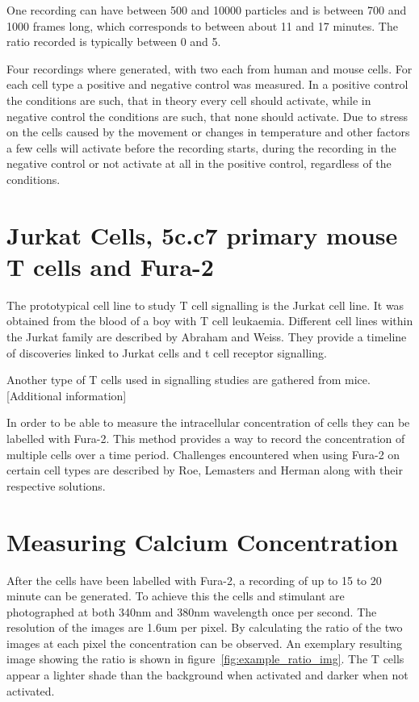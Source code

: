 
One recording can have between 500 and 10000 particles and is between 700 and 1000 frames long, which corresponds to between about 11 and 17 minutes. The ratio recorded is typically between 0 and 5.

Four recordings where generated, with two each from human and mouse cells. For each cell type a positive and negative control was measured. In a positive control the conditions are such, that in theory every cell should activate, while in negative control the conditions are such, that none should activate. Due to stress on the cells caused by the movement or changes in temperature and other factors a few cells will activate before the recording starts, during the recording in the negative control or not activate at all in the positive control, regardless of the conditions.

\section{Jurkat Cells, 5c.c7 primary mouse T cells and Fura-2}

The prototypical cell line to study T cell signalling is the Jurkat cell line.\cite{morgan2023} It was obtained from the blood of a boy with T cell leukaemia.\cite{schneider1977} Different cell lines within the Jurkat family are described by Abraham and Weiss.\cite{abraham2004} They provide a timeline of discoveries linked to Jurkat cells and t cell receptor signalling.

Another type of T cells used in signalling studies are gathered from mice. [Additional information]

In order to be able to measure the intracellular \Calcium concentration of cells they can be labelled with Fura-2. This method provides a way to record the \Calcium concentration of multiple cells over a time period.\cite{martinez2017} Challenges encountered when using Fura-2 on certain cell types are described by Roe, Lemasters and Herman along with their respective solutions.\cite{roe1990}

\section{Measuring Calcium Concentration}

After the cells have been labelled with Fura-2, a recording of up to 15 to 20 minute can be generated. To achieve this the cells and stimulant are photographed at both 340nm and 380nm wavelength once per second. The resolution of the images are 1.6um per pixel. By calculating the ratio of the two images at each pixel the \Calcium concentration can be observed. An exemplary resulting image showing the ratio is shown in figure~\ref{fig:example_ratio_img}. The T cells appear a lighter shade than the background when activated and darker when not activated.

